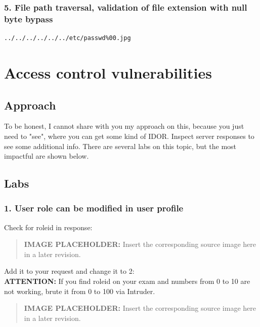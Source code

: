 \documentclass[
  letterpaper,
]{article}
\begin{document}
\subsubsection{5. File path traversal, validation of file extension with
null byte
bypass}\label{5-file-path-traversal-validation-of-file-extension-with-null-byte-bypass}

\begin{Verbatim}[breaklines,breakanywhere,fontsize=\small]
../../../../../../etc/passwd%00.jpg
\end{Verbatim}

\section{Access control
vulnerabilities}\label{access-control-vulnerabilities}

\subsection{Approach}\label{approach-12}

To be honest, I cannot share with you my approach on this, because you
just need to "see", where you can get some kind of IDOR. Inspect server
responses to see some additional info. There are several labs on this
topic, but the most impactful are shown below.

\subsection{Labs}\label{labs-11}

\subsubsection{1. User role can be modified in user
profile}\label{1-user-role-can-be-modified-in-user-profile}

Check for roleid in response:\\
\begin{quote}
\textbf{IMAGE PLACEHOLDER:} Insert the corresponding source image here in a later revision.
\end{quote}
Add it to your request and change it to 2:\\
\textbf{ATTENTION:} If you find roleid on your exam and numbers from 0
to 10 are not working, brute it from 0 to 100 via Intruder.\\
\begin{quote}
\textbf{IMAGE PLACEHOLDER:} Insert the corresponding source image here in a later revision.
\end{quote}
\end{document}
